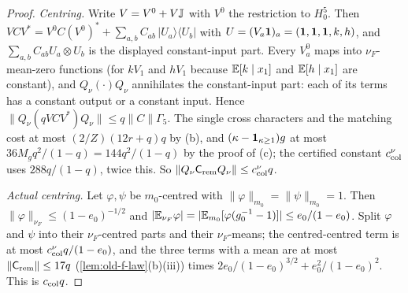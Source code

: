 \begin{proof}
\emph{Centring.} Write $V=V^0+V\mathbb J$ with $V^0$ the restriction to $H_0^5$.
Then $VCV^*=V^0C(V^0)^*+\sum_{a,b}C_{ab}\,|U_a\rangle\langle U_b|$ with
$U=(V_a\mathbf 1)_a=(\mathbf 1,\mathbf 1,\mathbf 1,k,h)$, and $\sum_{a,b}C_{ab}U_a\otimes U_b$ is the
displayed constant-input part. Every $V^0_a$ maps into $\nu_F$-mean-zero
functions (for $kV_1$ and $hV_1$ because $\mathbb E[k\mid x_1]$ and $\mathbb E[h\mid x_1]$ are
constant), and $Q_\nu(\cdot)Q_\nu$ annihilates the constant-input part: each of
its terms has a constant output or a constant input. Hence $\|Q_\nu(qVCV^*)Q_\nu\|\le q\|C\|\Gamma_5$. The single cross
characters and the matching cost at most $(2/Z)(12r+q)q$ by (b), and
$(\kappa-\mathbf 1_{\kappa\ge1})g$ at most $36M_gq^2/(1-q)=144q^2/(1-q)$ by the proof of
(c); the certified constant $c^\nu_{\rm col}$ uses $288q/(1-q)$, twice this. So
$\|Q_\nu\mathsf C_{\rm rem}Q_\nu\|\le c^\nu_{\rm col}q$.

\emph{Actual centring.} Let $\varphi,\psi$ be $m_0$-centred with
$\|\varphi\|_{m_0}=\|\psi\|_{m_0}=1$. Then $\|\varphi\|_{\nu_F}\le(1-e_0)^{-1/2}$ and
$|\mathbb E_{\nu_F}\varphi|=|\mathbb E_{m_0}[\varphi(g_0^{-1}-1)]|\le e_0/(1-e_0)$. Split $\varphi$ and
$\psi$ into their $\nu_F$-centred parts and their $\nu_F$-means; the centred-centred
term is at most $c^\nu_{\rm col}q/(1-e_0)$, and the three terms with a mean are at
most $\|\mathsf C_{\rm rem}\|\le17q$ (\cref{lem:old-f-law}(b)(iii)) times
$2e_0/(1-e_0)^{3/2}+e_0^2/(1-e_0)^2$. This is $c_{\rm col}q$.
\end{proof}


